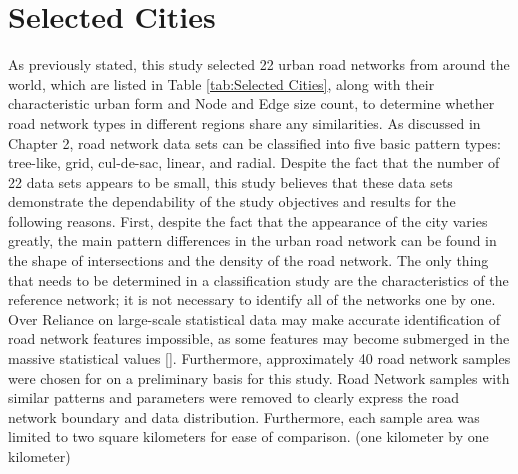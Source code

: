 \section{Selected Cities}
As previously stated, this study selected 22 urban road networks from around the world, which are listed in Table \ref{tab:Selected Cities}, along with their characteristic urban form and Node and Edge size count, to determine whether road network types in different regions share any similarities. As discussed in Chapter 2, road network data sets can be classified into five basic pattern types: tree-like, grid, cul-de-sac, linear, and radial. Despite the fact that the number of 22 data sets appears to be small, this study believes that these data sets demonstrate the dependability of the study objectives and results for the following reasons. First, despite the fact that the appearance of the city varies greatly, the main pattern differences in the urban road network can be found in the shape of intersections and the density of the road network. The only thing that needs to be determined in a classification study are the characteristics of the reference network; it is not necessary to identify all of the networks one by one. Over Reliance on large-scale statistical data may make accurate identification of road network features impossible, as some features may become submerged in the massive statistical values [\cite{Han:2020}]. Furthermore, approximately 40 road network samples were chosen for on a preliminary basis for this study. Road Network samples with similar patterns and parameters were removed to clearly express the road network boundary and data distribution.
Furthermore, each sample area was limited to two square kilometers for ease of comparison. (one kilometer by one kilometer)


